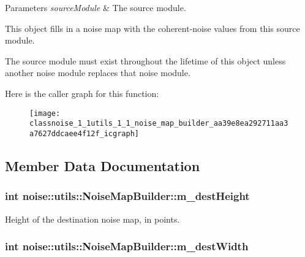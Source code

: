 \begin{DoxyParams}{Parameters}
{\em source\+Module} & The source module.\\
\hline
\end{DoxyParams}
This object fills in a noise map with the coherent-\/noise values from this source module.

The source module must exist throughout the lifetime of this object unless another noise module replaces that noise module. 

Here is the caller graph for this function\+:\nopagebreak
\begin{figure}[H]
\begin{center}
\leavevmode
\texttt{[image: classnoise\_1\_1utils\_1\_1\_noise\_map\_builder\_aa39e8ea292711aa3a7627ddcaee4f12f\_icgraph]}
\end{center}
\end{figure}




\subsection{Member Data Documentation}
\hypertarget{classnoise_1_1utils_1_1_noise_map_builder_a06a6db4772fe959e741be9ebe2023ce8}{
\subsubsection[{m\+\_\+dest\+Height}]{\setlength{\rightskip}{0pt plus 5cm}int noise\+::utils\+::\+Noise\+Map\+Builder\+::m\+\_\+dest\+Height\hspace{0.3cm}{\ttfamily [protected]}}}\label{classnoise_1_1utils_1_1_noise_map_builder_a06a6db4772fe959e741be9ebe2023ce8}


Height of the destination noise map, in points. 

\hypertarget{classnoise_1_1utils_1_1_noise_map_builder_a95d8075e9917c2a1c319a0afe639dd31}{
\subsubsection[{m\+\_\+dest\+Width}]{\setlength{\rightskip}{0pt plus 5cm}int noise\+::utils\+::\+Noise\+Map\+Builder\+::m\+\_\+dest\+Width\hspace{0.3cm}{\ttfamily [protected]}}}\label{classnoise_1_1utils_1_1_noise_map_builder_a95d8075e9917c2a1c319a0afe639dd31}


